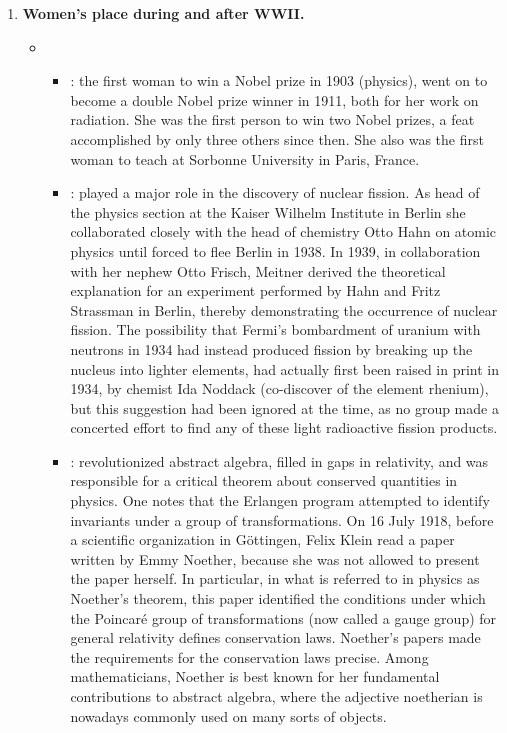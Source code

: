 \documentclass[12pt,a4paper]{article}
\begin{document}
  \begin{center}
    \large{}
  \end{center}
  \begin{enumerate}
    \item \textbf{Women's place during and after WWII.}
    \begin{itemize}
      \item {}
      \begin{itemize}
        \item {}: the first woman to win a Nobel prize in 1903 (physics), went on to become a double Nobel prize winner in 1911, both for her work on radiation. She was the first person to win two Nobel prizes, a feat accomplished by only three others since then. She also was the first woman to teach at Sorbonne University in Paris, France.
        \item {}: played a major role in the discovery of nuclear fission. As head of the physics section at the Kaiser Wilhelm Institute in Berlin she collaborated closely with the head of chemistry Otto Hahn on atomic physics until forced to flee Berlin in 1938. In 1939, in collaboration with her nephew Otto Frisch, Meitner derived the theoretical explanation for an experiment performed by Hahn and Fritz Strassman in Berlin, thereby demonstrating the occurrence of nuclear fission. The possibility that Fermi's bombardment of uranium with neutrons in 1934 had instead produced fission by breaking up the nucleus into lighter elements, had actually first been raised in print in 1934, by chemist Ida Noddack (co-discover of the element rhenium), but this suggestion had been ignored at the time, as no group made a concerted effort to find any of these light radioactive fission products.
        \item {}: revolutionized abstract algebra, filled in gaps in relativity, and was responsible for a critical theorem about conserved quantities in physics. One notes that the Erlangen program attempted to identify invariants under a group of transformations. On 16 July 1918, before a scientific organization in Göttingen, Felix Klein read a paper written by Emmy Noether, because she was not allowed to present the paper herself. In particular, in what is referred to in physics as Noether's theorem, this paper identified the conditions under which the Poincaré group of transformations (now called a gauge group) for general relativity defines conservation laws. Noether's papers made the requirements for the conservation laws precise. Among mathematicians, Noether is best known for her fundamental contributions to abstract algebra, where the adjective noetherian is nowadays commonly used on many sorts of objects.

\end{itemize}
\end{itemize}
\end{enumerate}
\end{document}
